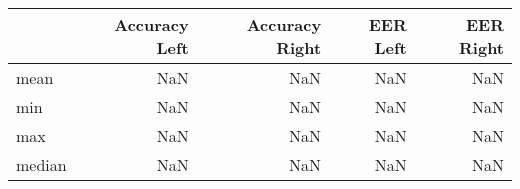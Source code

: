 \begin{tabular}{lrrrr}
\toprule
{} &  Accuracy Left &  Accuracy Right &  EER Left &  EER Right \\
\midrule
mean   &            NaN &             NaN &       NaN &        NaN \\
min    &            NaN &             NaN &       NaN &        NaN \\
max    &            NaN &             NaN &       NaN &        NaN \\
median &            NaN &             NaN &       NaN &        NaN \\
\bottomrule
\end{tabular}
